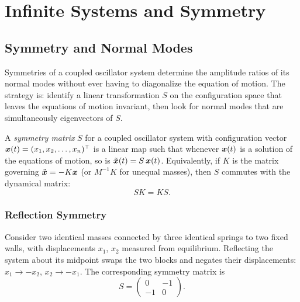 \chapter{Infinite Systems and Symmetry}

\section{Symmetry and Normal Modes}

Symmetries of a coupled oscillator system determine the amplitude ratios of its normal modes without ever having to diagonalize the equation of motion. The strategy is: identify a linear transformation $S$ on the configuration space that leaves the equations of motion invariant, then look for normal modes that are simultaneously eigenvectors of $S$.

\begin{definition}
A \emph{symmetry matrix} $S$ for a coupled oscillator system with configuration vector $\bm{x}(t) = (x_1, x_2, \ldots, x_n)^\top$ is a linear map such that whenever $\bm{x}(t)$ is a solution of the equations of motion, so is $\tilde{\bm{x}}(t) = S\,\bm{x}(t)$. Equivalently, if $K$ is the matrix governing $\ddot{\bm{x}} = -K\bm{x}$ (or $M^{-1}K$ for unequal masses), then $S$ commutes with the dynamical matrix:
\begin{equation}
    SK = KS.
\end{equation}
\end{definition}

\subsection{Reflection Symmetry}

Consider two identical masses connected by three identical springs to two fixed walls, with displacements $x_1$, $x_2$ measured from equilibrium. Reflecting the system about its midpoint swaps the two blocks and negates their displacements: $x_1 \to -x_2$, $x_2 \to -x_1$. The corresponding symmetry matrix is
\begin{equation}
    S = \begin{pmatrix} 0 & -1 \\ -1 & 0 \end{pmatrix}.
\end{equation}

